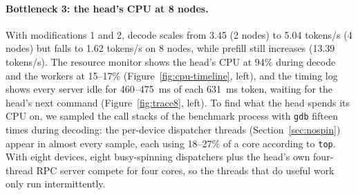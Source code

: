 \documentclass[11pt,a4paper]{article}
\begin{document}
\begin{table}[H]
\centering
\caption{Time per decode token from the timing logs (ms, average over 30 tokens). ``Allreduce'' includes waiting for the slowest peer; ``idle'' is time the server waits for the next command from the head.}
\label{tab:trace}
\end{table}

\paragraph{Bottleneck 3: the head's CPU at 8 nodes.} With modifications 1 and 2, decode scales from 3.45 (2 nodes) to 5.04 tokens/s (4 nodes) but falls to 1.62 tokens/s on 8 nodes, while prefill still increases (13.39 tokens/s). The resource monitor shows the head's CPU at 94\% during decode and the workers at 15--17\% (Figure~\ref{fig:cpu-timeline}, left), and the timing log shows every server idle for 460--475~ms of each 631~ms token, waiting for the head's next command (Figure~\ref{fig:trace8}, left). To find what the head spends its CPU on, we sampled the call stacks of the benchmark process with \texttt{gdb} fifteen times during decoding: the per-device dispatcher threads (Section~\ref{sec:nospin}) appear in almost every sample, each using 18--27\% of a core according to \texttt{top}. With eight devices, eight busy-spinning dispatchers plus the head's own four-thread RPC server compete for four cores, so the threads that do useful work only run intermittently.
\end{document}
